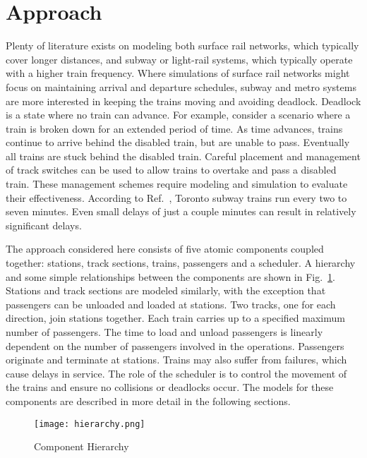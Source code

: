 \section{Approach}
Plenty of literature exists on modeling both surface rail networks, which typically cover longer distances, and subway or light-rail systems, which typically operate with a higher train frequency. Where simulations of surface rail networks might focus on maintaining arrival and departure schedules, subway and metro systems are more interested in keeping the trains moving and avoiding deadlock.  Deadlock is a state where no train can advance.  For example, consider a scenario where a train is broken down for an extended period of time.  As time advances, trains continue to arrive behind the disabled train, but are unable to pass.  Eventually all trains are stuck behind the disabled train.  Careful placement and management of track switches can be used to allow trains to overtake and pass a disabled train. These management schemes require modeling and simulation to evaluate their effectiveness.  According to Ref.~, Toronto subway trains run every two to seven minutes. Even small delays of just a couple minutes can result in relatively significant delays.

The approach considered here consists of five atomic components coupled together: stations, track sections, trains, passengers and a scheduler. A hierarchy and some simple relationships between the components are shown in Fig.~\ref{fig:hierarchy}.  Stations and track sections are modeled similarly, with the exception that passengers can be unloaded and loaded at stations. Two tracks, one for each direction, join stations together. Each train carries up to a specified maximum number of passengers. The time to load and unload passengers is linearly dependent on the number of passengers involved in the operations. Passengers originate and terminate at stations.  Trains may also suffer from failures, which cause delays in service.  The role of the scheduler is to control the movement of the trains and ensure no collisions or deadlocks occur.  The models for these components are described in more detail in the following sections.
%
\begin{figure}[htb]
	\centering
	\texttt{[image: hierarchy.png]}
	\caption{Component Hierarchy}
	\label{fig:hierarchy}
\end{figure}
%
